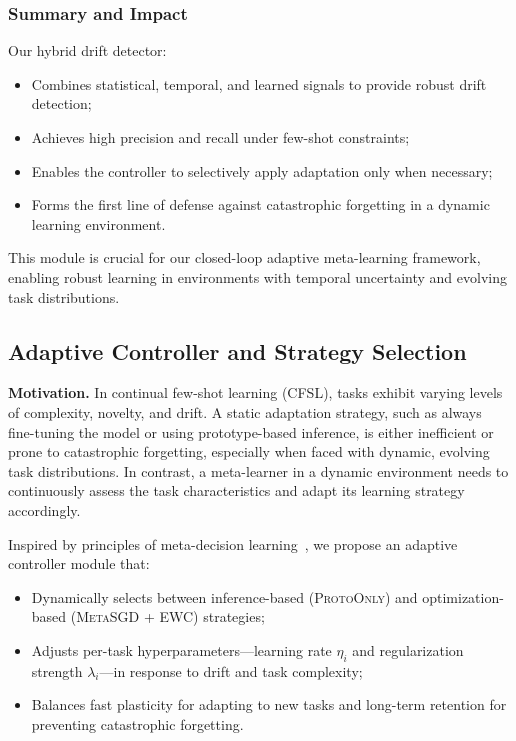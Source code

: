 \documentclass[conference]{IEEEtran}
\begin{document}
\subsubsection*{Summary and Impact}

Our hybrid drift detector:
\begin{itemize}
    \item Combines statistical, temporal, and learned signals to provide robust drift detection;
    \item Achieves high precision and recall under few-shot constraints;
    \item Enables the controller to selectively apply adaptation only when necessary;
    \item Forms the first line of defense against catastrophic forgetting in a dynamic learning environment.
\end{itemize}

This module is crucial for our closed-loop adaptive meta-learning framework, enabling robust learning in environments with temporal uncertainty and evolving task distributions.

\subsection{Adaptive Controller and Strategy Selection}

\textbf{Motivation.}  
In continual few-shot learning (CFSL), tasks exhibit varying levels of complexity, novelty, and drift. A static adaptation strategy, such as always fine-tuning the model or using prototype-based inference, is either inefficient or prone to catastrophic forgetting, especially when faced with dynamic, evolving task distributions. In contrast, a meta-learner in a dynamic environment needs to continuously assess the task characteristics and adapt its learning strategy accordingly. 

Inspired by principles of meta-decision learning~\cite{xu2021meta,rios2018few}, we propose an adaptive controller module that:
\begin{itemize}
    \item Dynamically selects between inference-based (\textsc{ProtoOnly}) and optimization-based (\textsc{MetaSGD + EWC}) strategies;
    \item Adjusts per-task hyperparameters—learning rate $\eta_i$ and regularization strength $\lambda_i$—in response to drift and task complexity;
    \item Balances fast plasticity for adapting to new tasks and long-term retention for preventing catastrophic forgetting.
\end{itemize}
\end{document}
